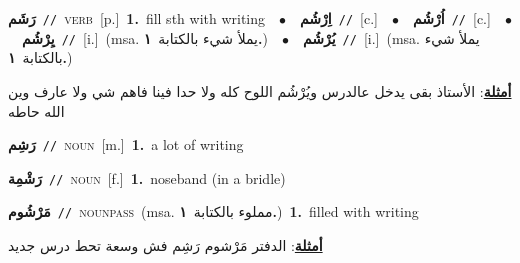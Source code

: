 \documentclass[10pt,a4paper,twoside]{article} %
\begin{document}
\begin{multicols}{2}
{\setlength\topsep{0pt}\textbf{\foreignlanguage{arabic}{رَشَم}}\ {\color{gray}\texttt{//}\color{black}}\ \textsc{verb}\ [p.]\ \textbf{1.}~fill sth with writing\ \ $\bullet$\ \ \setlength\topsep{0pt}\textbf{\foreignlanguage{arabic}{اِرْشُم}}\ {\color{gray}\texttt{//}\color{black}}\ [c.]\ \ $\bullet$\ \ \setlength\topsep{0pt}\textbf{\foreignlanguage{arabic}{اُرْشُم}}\ {\color{gray}\texttt{//}\color{black}}\ [c.]\ \ $\bullet$\ \ \setlength\topsep{0pt}\textbf{\foreignlanguage{arabic}{يِرْشُم}}\ {\color{gray}\texttt{//}\color{black}}\ [i.]\ \color{gray}(msa. \foreignlanguage{arabic}{يملأ شيء بالكتابة}~\foreignlanguage{arabic}{\textbf{١.}})\color{black}\ \ $\bullet$\ \ \setlength\topsep{0pt}\textbf{\foreignlanguage{arabic}{يُرْشُم}}\ {\color{gray}\texttt{//}\color{black}}\ [i.]\ \color{gray}(msa. \foreignlanguage{arabic}{يملأ شيء بالكتابة}~\foreignlanguage{arabic}{\textbf{١.}})\color{black}\  \begin{flushright}\color{gray}\foreignlanguage{arabic}{\textbf{\underline{\foreignlanguage{arabic}{أمثلة}}}: الأستاذ بقى يدخل عالدرس ويُرْشُم اللوح كله ولا حدا فينا فاهم شي ولا عارف وين الله حاطه}\end{flushright}\color{black}} \vspace{2mm}

{\setlength\topsep{0pt}\textbf{\foreignlanguage{arabic}{رَشِم}}\ {\color{gray}\texttt{//}\color{black}}\ \textsc{noun}\ [m.]\ \textbf{1.}~a lot of writing\ } \vspace{2mm}

{\setlength\topsep{0pt}\textbf{\foreignlanguage{arabic}{رَشْمِة}}\ {\color{gray}\texttt{//}\color{black}}\ \textsc{noun}\ [f.]\ \textbf{1.}~noseband (in a bridle)\ } \vspace{2mm}

{\setlength\topsep{0pt}\textbf{\foreignlanguage{arabic}{مَرْشُوم}}\ {\color{gray}\texttt{//}\color{black}}\ \textsc{noun\textunderscore pass}\ \color{gray}(msa. \foreignlanguage{arabic}{مملوء بالكتابة}~\foreignlanguage{arabic}{\textbf{١.}})\color{black}\ \textbf{1.}~filled with writing\  \begin{flushright}\color{gray}\foreignlanguage{arabic}{\textbf{\underline{\foreignlanguage{arabic}{أمثلة}}}: الدفتر مَرْشوم رَشِم فش وسعة تحط درس جديد}\end{flushright}\color{black}} \vspace{2mm}


\end{multicols}
\end{document}
